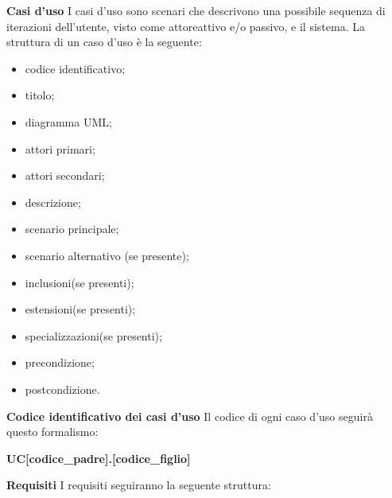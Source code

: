 				\newline \newline
				\textbf{Casi d'uso} \newline \newline
				I casi d'uso sono scenari che descrivono una possibile sequenza di iterazioni dell'utente, visto come attore\glo attivo e/o passivo, e il sistema. La struttura di un caso d'uso è la seguente:
				\begin{itemize}
					\item[] codice identificativo;
					\item[] titolo;
					\item[] diagramma UML\glo;
					\item[] attori primari;
					\item[] attori secondari;
					\item[] descrizione;
					\item[] scenario principale;
					\item[] scenario alternativo (se presente);
					\item[] inclusioni(se presenti);
					\item[] estensioni(se presenti);
					\item[] specializzazioni(se presenti);
					\item[] precondizione;
					\item[] postcondizione. 
				\end{itemize}
				\newline \newline
				\textbf{Codice identificativo dei casi d'uso} \newline \newline
			Il codice di ogni caso d'uso seguirà questo formalismo: \newline \newline
			\centerline{\textbf{UC[codice\_padre].[codice\_figlio]}} \newline \newline
			\textbf{Requisiti} \newline \newline
			I requisiti seguiranno la seguente struttura:
